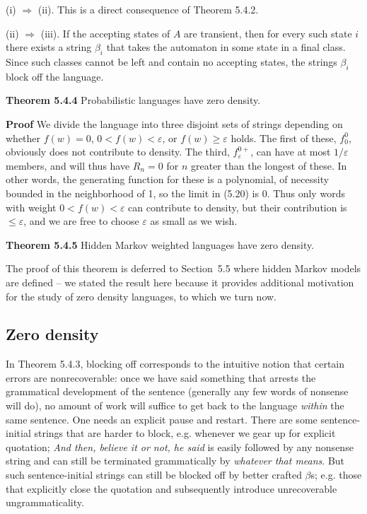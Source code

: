 (i) $\Rightarrow$ (ii). This is  a direct consequence of Theorem 5.4.2.

(ii) $\Rightarrow$ (iii). If the accepting states of $A$ are transient,
then for every such state $i$ there exists a string $\beta_i$ that takes the
automaton in some state in a final class. Since such classes cannot be left
and contain no accepting states, the strings $\beta_i$ block off the language.

\medskip\noindent
{\bf Theorem 5.4.4} Probabilistic languages have zero density.

\smallskip
\noindent
{\bf Proof} We divide the language into three disjoint sets of strings
depending on whether $f(w)=0$, $0 < f(w) <\varepsilon$, or $f(w) \geq
\varepsilon$ holds.  The first of these, $f_0^0$, obviously does not
contribute to density. The third, $f_\varepsilon^{0+}$, can have at most
$1/\varepsilon$ members, and will thus have $R_n = 0$ for $n$ greater than the
longest of these. In other words, the generating function for these is a
polynomial, of necessity bounded in the neighborhood of 1, so the limit in
(5.20) is 0. Thus only words with weight $0 < f(w) <\varepsilon$ can
contribute to density, but their contribution is $ \leq \varepsilon$, and we
are free to choose $\varepsilon$ as small as we wish.

\medskip\noindent
{\bf Theorem 5.4.5} Hidden Markov weighted languages have zero density.

\smallskip
\noindent
The proof of this theorem is deferred to Section~5.5 where hidden Markov
models are defined -- we stated the result here because it provides additional
motivation for the study of zero density languages, to which we turn now.

\subsection{Zero density}


In Theorem 5.4.3, blocking off corresponds to the intuitive notion that certain
errors are nonrecoverable: once we have said something that arrests the
grammatical development of the sentence (generally any few words of nonsense
will do), no amount of work will suffice to get back to the language {\it
  within} the same sentence. One needs an explicit pause and restart. There
are some sentence-initial strings that are harder to block, e.g. whenever we
gear up for explicit quotation; {\it And then, believe it or not, he said} is
easily followed by any nonsense string and can still be terminated
grammatically by {\it whatever that means}. But such sentence-initial strings
can still be blocked off by better crafted $\beta$s; e.g. those that
explicitly close the quotation and subsequently introduce unrecoverable
ungrammaticality.

